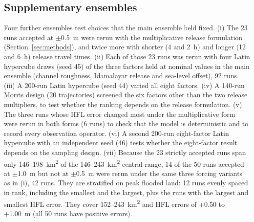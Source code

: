 \documentclass[preprint,12pt,authoryear]{elsarticle}
\newcommand{\kmsq}{km\textsuperscript{2}}
\begin{document}
\subsection{Supplementary ensembles}
\label{sec:suppmethod}
Four further ensembles test choices that the main ensemble held fixed. (i) The 23 runs accepted at $\pm$0.5~m were rerun with the multiplicative release formulation (Section~\ref{sec:methods}), and twice more with shorter (4 and 2~h) and longer (12 and 6~h) release travel times. (ii) Each of those 23 runs was rerun with four Latin hypercube draws (seed 45) of the three factors held at nominal values in the main ensemble (channel roughness, Idamalayar release and sea-level offset), 92 runs. (iii) A 200-run Latin hypercube (seed 44) varied all eight factors. (iv) A 140-run Morris design (20 trajectories) screened the six factors other than the two release multipliers, to test whether the ranking depends on the release formulation. (v) The three runs whose HFL error changed most under the multiplicative form were rerun in both forms (6 runs) to check that the model is deterministic and to record every observation operator. (vi) A second 200-run eight-factor Latin hypercube with an independent seed (46) tests whether the eight-factor result depends on the sampling design. (vii) Because the 23 strictly accepted runs span only 146--198~\kmsq{} of the 146--243~\kmsq{} central range, 14 of the 50 runs accepted at $\pm$1.0~m but not at $\pm$0.5~m were rerun under the same three forcing variants as in (i), 42 runs. They are stratified on peak flooded land: 12 runs evenly spaced in rank, including the smallest and the largest, plus the runs with the largest and smallest HFL error. They cover 152--243~\kmsq{} and HFL errors of +0.50 to +1.00~m (all 50 runs have positive errors).
\end{document}
